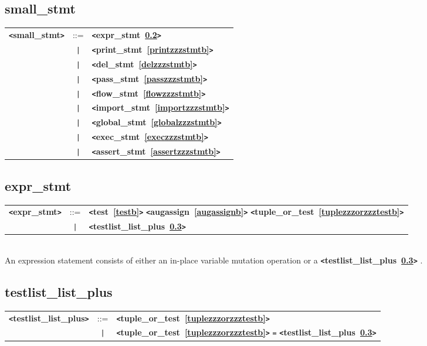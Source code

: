 \documentclass[12pt]{article}
\begin{document}
\subsection{small\_stmt}
\label{smallzzzstmtb}
\begin{tabular}{lcl}
{\bf \verb+<+small\_stmt\verb+>+} & ::=  & {\bf \verb+<+expr\_stmt~\ref{exprzzzstmtb}\verb+>+}  \\
 & \verb+|+  & {\bf \verb+<+print\_stmt~\ref{printzzzstmtb}\verb+>+}  \\
 & \verb+|+  & {\bf \verb+<+del\_stmt~\ref{delzzzstmtb}\verb+>+}  \\
 & \verb+|+  & {\bf \verb+<+pass\_stmt~\ref{passzzzstmtb}\verb+>+}  \\
 & \verb+|+  & {\bf \verb+<+flow\_stmt~\ref{flowzzzstmtb}\verb+>+}  \\
 & \verb+|+  & {\bf \verb+<+import\_stmt~\ref{importzzzstmtb}\verb+>+}  \\
 & \verb+|+  & {\bf \verb+<+global\_stmt~\ref{globalzzzstmtb}\verb+>+}  \\
 & \verb+|+  & {\bf \verb+<+exec\_stmt~\ref{execzzzstmtb}\verb+>+}  \\
 & \verb+|+  & {\bf \verb+<+assert\_stmt~\ref{assertzzzstmtb}\verb+>+}  \\
\end{tabular}

\subsection{expr\_stmt}
\label{exprzzzstmtb}
\begin{tabular}{lcl}
{\bf \verb+<+expr\_stmt\verb+>+} & ::=  & {\bf \verb+<+test~\ref{testb}\verb+>+}  {\bf \verb+<+augassign~\ref{augassignb}\verb+>+}  {\bf \verb+<+tuple\_or\_test~\ref{tuplezzzorzzztestb}\verb+>+}  \\
 & \verb+|+  & {\bf \verb+<+testlist\_list\_plus~\ref{testlistzzzlistzzzplusb}\verb+>+}  \\
\end{tabular} \\

An expression statement consists of either an in-place variable mutation operation or a {\bf \verb+<+testlist\_list\_plus~\ref{testlistzzzlistzzzplusb}\verb+>+} .

\subsection{testlist\_list\_plus}
\label{testlistzzzlistzzzplusb}
\begin{tabular}{lcl}
{\bf \verb+<+testlist\_list\_plus\verb+>+} & ::=  & {\bf \verb+<+tuple\_or\_test~\ref{tuplezzzorzzztestb}\verb+>+}  \\
 & \verb+|+  & {\bf \verb+<+tuple\_or\_test~\ref{tuplezzzorzzztestb}\verb+>+}  \verb|=| {\bf \verb+<+testlist\_list\_plus~\ref{testlistzzzlistzzzplusb}\verb+>+}  \\
\end{tabular} \\
\end{document}
